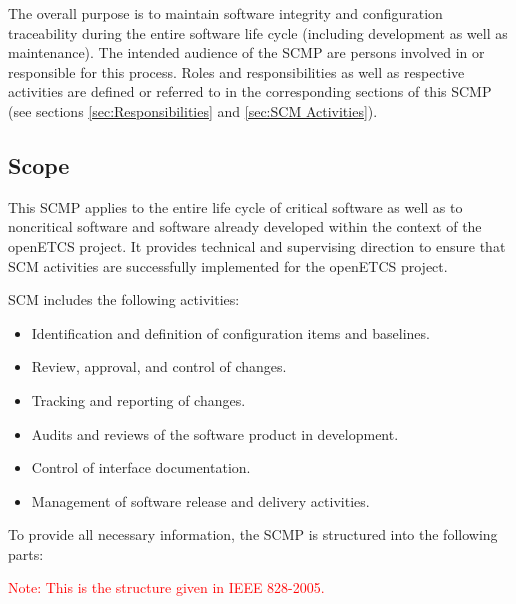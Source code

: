 \documentclass{template/openetcs_article}
\begin{document}
The overall purpose is to maintain software integrity and configuration traceability during the entire software life cycle (including development as well as maintenance). The intended audience of the SCMP are persons involved in or responsible for this process. Roles and responsibilities as well as respective activities are defined or referred to in the corresponding sections of this SCMP (see sections \ref{sec:Responsibilities} and \ref{sec:SCM Activities}).


\subsection{Scope } %
\label {sec:Scope}

This SCMP applies to the entire life cycle of critical software as well as to noncritical software and software already developed within the context of the openETCS project. It provides technical and supervising direction to ensure that SCM activities are successfully implemented for the openETCS project.

SCM includes the following activities:

\vspace{-10pt}
\begin{itemize}
\item Identification and definition of configuration items and baselines.
\item Review, approval, and control of changes.
\item Tracking and reporting of changes.
\item Audits and reviews of the software product in development.
\item Control of interface documentation.
\item Management of software release and delivery activities.
\end{itemize}

To provide all necessary information, the SCMP is structured into the following parts:

\textcolor{red}{Note: This is the structure given in IEEE 828-2005.}
\end{document}
